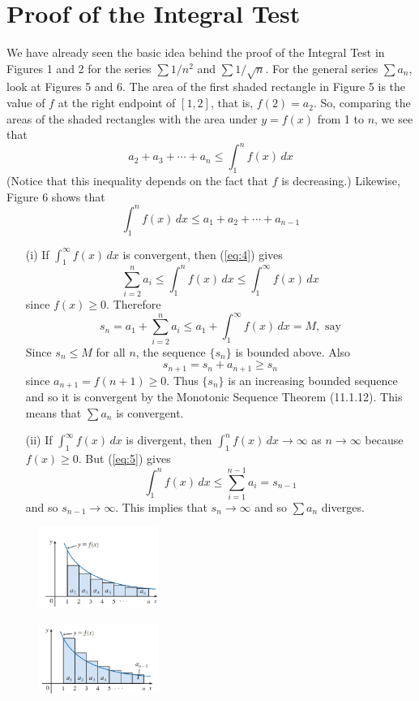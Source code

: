 \documentclass{article}
\begin{document}
\section*{Proof of the Integral Test}
We have already seen the basic idea behind the proof of the Integral Test in Figures 1 and 2 for the series \( \sum 1/n^2 \) and \( \sum 1/\sqrt{n} \). For the general series \( \sum a_n \), look at Figures 5 and 6. The area of the first shaded rectangle in Figure 5 is the value of \( f \) at the right endpoint of \( [1, 2] \), that is, \( f(2) = a_2 \). So, comparing the areas of the shaded rectangles with the area under \( y = f(x) \) from 1 to \( n \), we see that
\begin{equation}
    a_2 + a_3 + \cdots + a_n \le \int_1^n f(x) \,dx \label{eq:4}
\end{equation}
(Notice that this inequality depends on the fact that \( f \) is decreasing.) Likewise, Figure 6 shows that
\begin{equation}
    \int_1^n f(x) \,dx \le a_1 + a_2 + \cdots + a_{n-1} \label{eq:5}
\end{equation}

\begin{itemize}
    \item[(i)] If \( \int_1^\infty f(x) \,dx \) is convergent, then (\ref{eq:4}) gives
    \[ \sum_{i=2}^{n} a_i \le \int_1^n f(x) \,dx \le \int_1^\infty f(x) \,dx \]
    since \( f(x) \ge 0 \). Therefore
    \[ s_n = a_1 + \sum_{i=2}^{n} a_i \le a_1 + \int_1^\infty f(x) \,dx = M, \text{ say} \]
    Since \( s_n \le M \) for all \( n \), the sequence \( \{s_n\} \) is bounded above. Also
    \[ s_{n+1} = s_n + a_{n+1} \ge s_n \]
    since \( a_{n+1} = f(n+1) \ge 0 \). Thus \( \{s_n\} \) is an increasing bounded sequence and so it is convergent by the Monotonic Sequence Theorem (11.1.12). This means that \( \sum a_n \) is convergent.
    
    \item[(ii)] If \( \int_1^\infty f(x) \,dx \) is divergent, then \( \int_1^n f(x) \,dx \to \infty \) as \( n \to \infty \) because \( f(x) \ge 0 \). But (\ref{eq:5}) gives
    \[ \int_1^n f(x) \,dx \le \sum_{i=1}^{n-1} a_i = s_{n-1} \]
    and so \( s_{n-1} \to \infty \). This implies that \( s_n \to \infty \) and so \( \sum a_n \) diverges.
\end{itemize}

\begin{figure}[htbp]
    \centering
    \includegraphics[width=0.35\textwidth]{graph74.png}
\end{figure}
\begin{figure}[htbp]
    \centering
    \includegraphics[width=0.35\textwidth]{graph75.png}
\end{figure}
\end{document}
